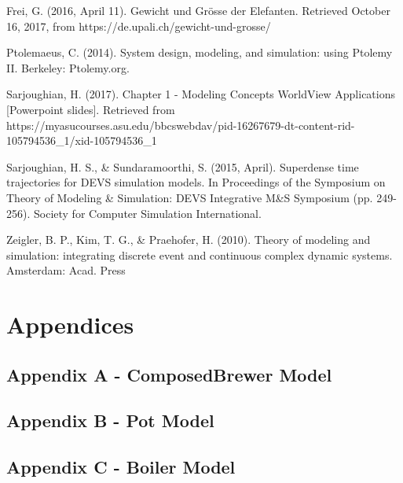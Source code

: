\documentclass[10pt]{article}
\newcommand{\hin}{\hangindent=8mm \hangafter=1 \noindent }
\begin{document}
\hin Frei, G. (2016, April 11). Gewicht und Grösse der Elefanten. Retrieved October 16, 2017, from https://de.upali.ch/gewicht-und-grosse/

\hin Ptolemaeus, C. (2014). System design, modeling, and simulation: using Ptolemy II. Berkeley: Ptolemy.org.

\hin Sarjoughian, H. (2017). Chapter 1 - Modeling Concepts WorldView Applications [Powerpoint slides]. Retrieved from https://myasucourses.asu.edu/bbcswebdav/pid-16267679-dt-content-rid-105794536\_1/xid-105794536\_1

\hin Sarjoughian, H. S., \& Sundaramoorthi, S. (2015, April). Superdense time trajectories for DEVS simulation models. In Proceedings of the Symposium on Theory of Modeling \& Simulation: DEVS Integrative M\&S Symposium (pp. 249-256). Society for Computer Simulation International.

\hin Zeigler, B. P., Kim, T. G., \& Praehofer, H. (2010). Theory of modeling and simulation: integrating discrete event and continuous complex dynamic systems. Amsterdam: Acad. Press
\singlespace

\newpage
\section{Appendices}
\subsection{Appendix A - ComposedBrewer Model}
\begin{scriptsize}

\end{scriptsize}
\newpage
\subsection{Appendix B - Pot Model}
\begin{scriptsize}

\end{scriptsize}
\newpage
\subsection{Appendix C - Boiler Model}
\begin{scriptsize}

\end{scriptsize}
\newpage
\end{document}
